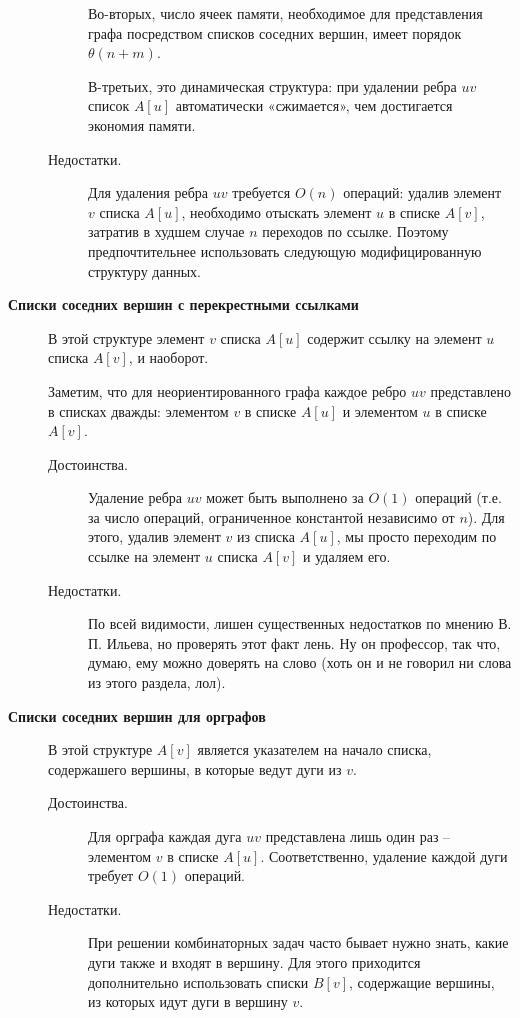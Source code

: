 \begin{note}
\begin{description}
\begin{description}
                        Во-вторых, число ячеек памяти, необходимое для представления графа посредством списков соседних вершин, имеет порядок $ \theta(n + m) $.

                        В-третьих, это динамическая структура: при удалении ребра $ uv $ список $ A[u] $ автоматически «сжимается», чем достигается экономия памяти.
                  \item[Недостатки.] Для удаления ребра $ uv $ требуется $ O(n) $ операций: удалив элемент $ v $ списка $ A[u] $, необходимо отыскать элемент $ u $ в списке $ A[v] $, затратив в худшем случае $ n $ переходов по ссылке. Поэтому предпочтительнее использовать следующую модифицированную структуру данных.
              \end{description}

        \item[\circled{5} \textbf{Списки соседних вершин с перекрестными ссылками}]
              В этой структуре элемент $ v $ списка $ A[u] $ содержит ссылку на элемент $ u $ списка $ A[v] $, и наоборот.

              Заметим, что для неориентированного графа каждое ребро $ uv $ представлено в списках дважды: элементом $ v $ в списке $ A[u] $ и элементом $ u $ в списке $ A[v] $.
              \begin{description}
                  \item[Достоинства.]
                        Удаление ребра $ uv $ может быть выполнено за $ O(1) $ операций (т.е. за число операций, ограниченное константой независимо от $ n $).
                        Для этого, удалив элемент $ v $ из списка $ A[u] $, мы просто переходим по ссылке на элемент $ u $ списка $ A[v] $ и удаляем его.
                  \item[Недостатки.] По всей видимости, лишен существенных недостатков по мнению В. П. Ильева, но проверять этот факт лень. Ну он профессор, так что, думаю, ему можно доверять на слово (хоть он и не говорил ни слова из этого раздела, лол).
              \end{description}

        \item[\circled{6} \textbf{Списки соседних вершин для орграфов}]
              В этой структуре $ A[v] $ является указателем на начало списка, содержашего вершины, в которые ведут дуги из $ v $.
              \begin{description}
                  \item[Достоинства.] Для орграфа каждая дуга $ uv $ представлена лишь один раз – элементом $ v $ в списке $ A[u] $. Соответственно, удаление каждой дуги требует $ O(1) $ операций.
                  \item[Недостатки.]
                        При решении комбинаторных задач часто бывает нужно знать, какие дуги также и входят в вершину. Для этого приходится дополнительно использовать списки $ B[v] $, содержащие вершины, из которых идут дуги в вершину $ v $.


\end{description}
\end{description}
\end{note}
